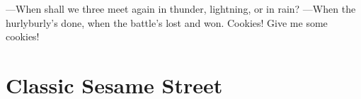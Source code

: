\documentclass{book}
\begin{document}
\begin{savequote}[45mm]
---When shall we three meet again
in thunder, lightning, or in rain?
---When the hurlyburly’s done,
when the battle’s lost and won.
Cookies! Give me some cookies!
\end{savequote}
\chapter{Classic Sesame Street}
\end{document}
